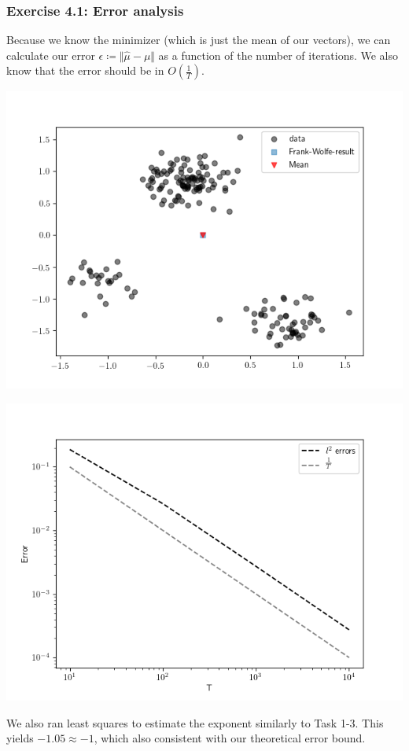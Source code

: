\documentclass[10pt,aspectratio=169,handout]{beamer}
\begin{document}
\begin{frame}
    \frametitle{Exercise 4.1: Error analysis}

    Because we know the minimizer (which is just the mean of our vectors), we can calculate our error $\epsilon \coloneqq \Vert \hat{\mu}-\mu\Vert$
    as a function of the number of iterations. We also know that the error should be in $O(\frac{1}{T})$.

    \begin{minipage}{0.49\textwidth}
        \includegraphics[width=\textwidth]{images/10000.png}
    \end{minipage}
    \begin{minipage}{0.49\textwidth}
        \includegraphics[width=\textwidth]{images/errors.png}
    \end{minipage}

    We also ran least squares to estimate the exponent similarly to Task 1-3. This yields $-1.05 \approx -1$, which also 
    consistent with our theoretical error bound.

\end{frame}
\end{document}
